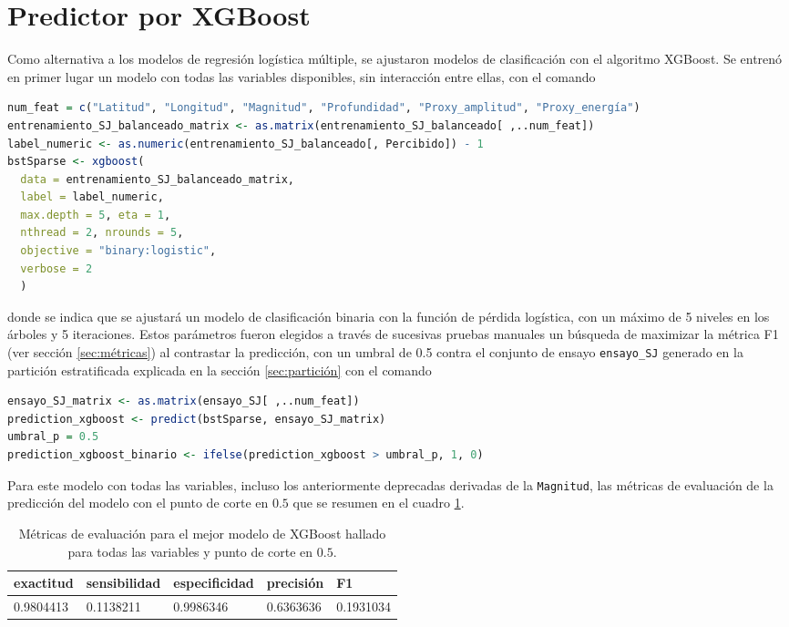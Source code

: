 \documentclass[a4paper]{report}
\begin{document}
\section{Predictor por XGBoost}
Como alternativa a los modelos de regresión logística múltiple, se ajustaron modelos de clasificación con el algoritmo XGBoost.
Se entrenó en primer lugar un modelo con todas las variables disponibles, sin interacción entre ellas, con el comando
\begin{lstlisting}[language=R, breaklines=true]
num_feat = c("Latitud", "Longitud", "Magnitud", "Profundidad", "Proxy_amplitud", "Proxy_energía")
entrenamiento_SJ_balanceado_matrix <- as.matrix(entrenamiento_SJ_balanceado[ ,..num_feat])
label_numeric <- as.numeric(entrenamiento_SJ_balanceado[, Percibido]) - 1
bstSparse <- xgboost(
  data = entrenamiento_SJ_balanceado_matrix, 
  label = label_numeric, 
  max.depth = 5, eta = 1, 
  nthread = 2, nrounds = 5, 
  objective = "binary:logistic", 
  verbose = 2
  )
\end{lstlisting}
donde se indica que se ajustará un modelo de clasificación binaria con la función de pérdida logística, con un máximo de 5 niveles en los árboles y 5 iteraciones.
Estos parámetros fueron elegidos a través de sucesivas pruebas manuales un búsqueda de maximizar la métrica F1 (ver sección \ref{sec:métricas}) al contrastar la predicción, con un umbral de \num{0.5} contra el conjunto de ensayo \verb'ensayo_SJ' generado en la partición estratificada explicada en la sección \ref{sec:partición} con el comando
\begin{lstlisting}[language=R, breaklines=true]
ensayo_SJ_matrix <- as.matrix(ensayo_SJ[ ,..num_feat])
prediction_xgboost <- predict(bstSparse, ensayo_SJ_matrix)
umbral_p = 0.5
prediction_xgboost_binario <- ifelse(prediction_xgboost > umbral_p, 1, 0)
\end{lstlisting}
Para este modelo con todas las variables, incluso los anteriormente deprecadas derivadas de la \verb'Magnitud', las métricas de evaluación de la predicción del modelo con el punto de corte en \(0.5\) que se resumen en el cuadro \ref{tab:xgboost_metrics}.
\begin{table}[!ht]
	\centering
	\begin{tabular}{lllll}
	\toprule
	exactitud & sensibilidad & especificidad & precisión & F1 \\
	\midrule
	\num{0.9804413} & \num{0.1138211} & \num{0.9986346} & \num{0.6363636} & \num{0.1931034} \\
	\bottomrule
	\end{tabular}
	\caption{Métricas de evaluación para el mejor modelo de XGBoost hallado para todas las variables y punto de corte en \(0.5\).}
	\label{tab:xgboost_metrics}
\end{table}
\end{document}
